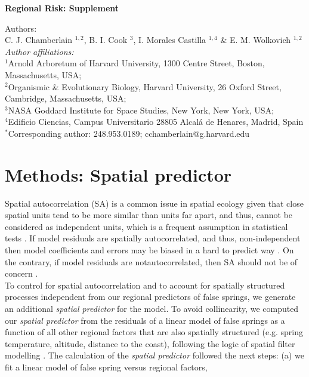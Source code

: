 \documentclass{article}\usepackage[]{graphicx}\usepackage[]{color}
\begin{document}
\noindent \textbf{\Large{Regional Risk: Supplement}}

\noindent Authors:\\
C. J. Chamberlain $^{1,2}$, B. I. Cook $^{3}$, I. Morales Castilla $^{1,4}$ \& E. M. Wolkovich $^{1,2}$
\vspace{2ex}\\
\emph{Author affiliations:}\\
$^{1}$Arnold Arboretum of Harvard University, 1300 Centre Street, Boston, Massachusetts, USA; \\
$^{2}$Organismic \& Evolutionary Biology, Harvard University, 26 Oxford Street, Cambridge, Massachusetts, USA; \\
$^{3}$NASA Goddard Institute for Space Studies, New York, New York, USA; \\
$^{4}$Edificio Ciencias, Campus Universitario 28805 Alcalá de Henares, Madrid, Spain \\
\vspace{2ex}
$^*$Corresponding author: 248.953.0189; cchamberlain@g.harvard.edu\\

\renewcommand{\thetable}{\arabic{table}}
\renewcommand{\thefigure}{\arabic{figure}}
\renewcommand{\labelitemi}{$-$}

\section*{Methods: Spatial predictor} %

Spatial autocorrelation (SA) is a common issue in spatial ecology given that close spatial units tend to be more similar than units far apart, and thus, cannot be considered as independent units, which is a frequent assumption in statistical tests \citep{diniz2003spatial}. If model residuals are spatially autocorrelated, and thus, non-independent then model coefficients and errors may be biased in a hard to predict way \citep{mauricio2009coefficient}. On the contrary, if model residuals are notautocorrelated, then SA should not be of concern \citep{hawkins2012eight}.\\

To control for spatial autocorrelation and to account for spatially structured processes independent from our regional predictors of false springs, we generate an additional \emph{spatial predictor} for the model. To avoid collinearity, we computed our \emph{spatial predictor} from the residuals of a linear model of false springs as a function of all other regional factors that are also spatially structured (e.g. spring temperature, altitude, distance to the coast), following the logic of spatial filter modelling \citep{diniz2005modelling}. The calculation of the \emph{spatial predictor} followed the next steps: (a) we fit a linear model of false spring versus regional factors,
\end{document}
